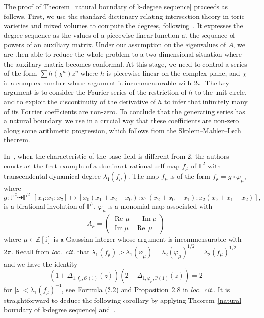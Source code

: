 \documentclass[11pt,a4paper]{article}
\theoremstyle{plain}
\theoremstyle{remark}
\theoremstyle{custombold}
\newcommand{\irm}{\mathrm{i}}
\DeclareMathOperator{\im}{\mathrm{Im}}
\newcommand{\re}{{\operatorname{Re}\,}}
\begin{document}
The proof of Theorem~\ref{natural boundary of k-degree sequence} proceeds as follows. First, we use the standard dictionary relating intersection theory in toric varieties and mixed volumes to compute the degrees, following~\cite{Huber-Sturmfels-1995}. It expresses the degree sequence as the values of
a piecewise linear function at the sequence of powers of an auxiliary matrix. Under our assumption on the eigenvalues of $A$, we are then able to reduce the whole problem to a two-dimensional situation where the auxiliary matrix
becomes conformal. At this stage, we need to control a series of the form $\sum h(\chi^n)z^n$ where $h$ is piecewise linear on the complex plane, and $\chi$ is a complex number whose argument is incommensurable with $2\pi$. The key argument is to consider the Fourier series of the restriction of $h$ to the unit circle, and to exploit the discontinuity of the derivative of $h$ to infer that infinitely many of its Fourier coefficients
are non-zero. To conclude that the generating series has a natural boundary, we use in a crucial way that
these coefficients are non-zero along some arithmetic progression, which follows
from the Skolem--Mahler--Lech theorem. 


In~\cite{BDJ-2020}, when the characteristic of the base field is different from 2, the authors construct the first example of a dominant rational self-map $f_\mu$ of $\mathbb P^2$ with transcendental dynamical degree $\lambda_1(f_\mu)$. The map $f_\mu$ is of the form $f_\mu=g\circ \varphi_\mu$, where   $$g\colon \mathbb P^2\dashrightarrow \mathbb P^2, [x_0 : x_1 : x_2] \mapsto [x_0(x_1 + x_2 - x_0) : x_1(x_2 + x_0 - x_1) : x_2(x_0 + x_1 - x_2)],$$
is a birational involution of $\mathbb P^2$, $\varphi_\mu$ is a monomial map associated with \[A_\mu=\begin{pmatrix}
\re \mu & -\im\mu \\ 
 \im \mu & \re \mu
\end{pmatrix}\] where $\mu\in\mathbb Z[\irm]$ is a Gaussian integer whose argument is incommensurable
with $2\pi$. Recall from \emph{loc.~cit.} that $\lambda_{1}(f_\mu)>\lambda_1(\varphi_\mu)=\lambda_2(\varphi_\mu)^{1/2}=\lambda_2(f_\mu)^{1/2}$ and we have the identity:
$$ (1+\Delta_{1,f_\mu,\mathcal O(1)}(z))(2-\Delta_{1,\varphi_\mu,\mathcal O(1)}(z))=2$$
for  $|z|<\lambda_{1}(f_\mu)^{-1}$, see~Formula (2.2) and Proposition~2.8 in \emph{loc.~cit.}. It is straightforward to deduce the following corollary by applying Theorem~\ref{natural boundary of k-degree sequence} and~\cite[Main Theorem]{Boucksom-Favre-Jonsson-2008}.  
\end{document}
